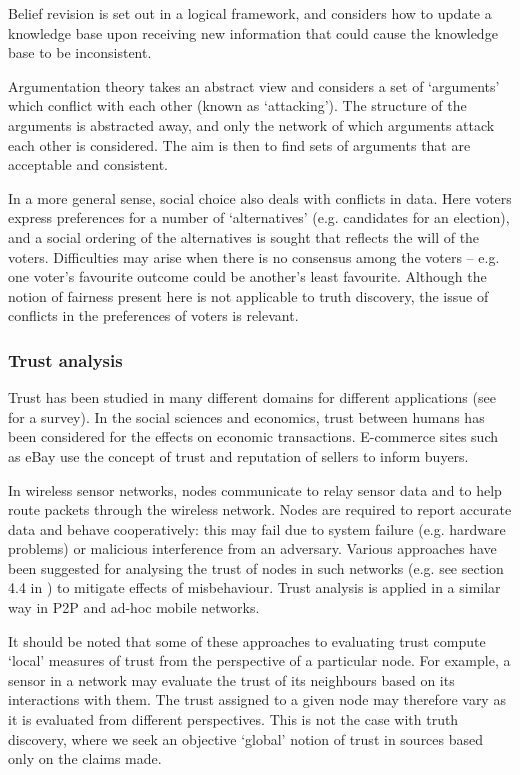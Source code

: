 \documentclass[../main.tex]{subfiles}
\begin{document}
Belief revision \cite{gardenfors} is set out in a logical framework, and
considers how to update a knowledge base upon receiving new information that
could cause the knowledge base to be inconsistent.

Argumentation theory takes an abstract view and considers a set of `arguments'
which conflict with each other (known as `attacking'). The structure of the
arguments is abstracted away, and only the network of which arguments attack
each other is considered. The aim is then to find sets of arguments that are
acceptable and consistent.


In a more general sense, social choice also deals with conflicts in data. Here
voters express preferences for a number of `alternatives' (e.g. candidates for
an election), and a social ordering of the alternatives is sought that reflects
the will of the voters. Difficulties may arise when there is no consensus among
the voters -- e.g. one voter's favourite outcome could be another's least
favourite. Although the notion of fairness present here is not applicable
to truth discovery, the issue of conflicts in the preferences of voters is
relevant.

\subsubsection{Trust analysis}

Trust has been studied in many different domains for different applications
(see \cite{momani_challa} for a survey). In the social sciences and economics,
trust between humans has been considered for the effects on economic
transactions. E-commerce sites such as eBay use the concept of trust and
reputation of sellers to inform buyers.

In wireless sensor networks, nodes communicate to relay sensor data and to help
route packets through the wireless network. Nodes are required to report
accurate data and behave cooperatively: this may fail due to system failure
(e.g. hardware problems) or malicious interference from an adversary. Various
approaches have been suggested for analysing the trust of nodes in such
networks (e.g. see section 4.4 in \cite{momani_challa}) to mitigate effects of
misbehaviour. Trust analysis is applied in a similar way in P2P and ad-hoc
mobile networks.

It should be noted that some of these approaches to evaluating trust compute
`local' measures of trust from the perspective of a particular node. For
example, a sensor in a network may evaluate the trust of its neighbours based
on its interactions with them. The trust assigned to a given node may therefore
vary as it is evaluated from different perspectives. This is not the case with
truth discovery, where we seek an objective `global' notion of trust in sources
based only on the claims made.
\end{document}
